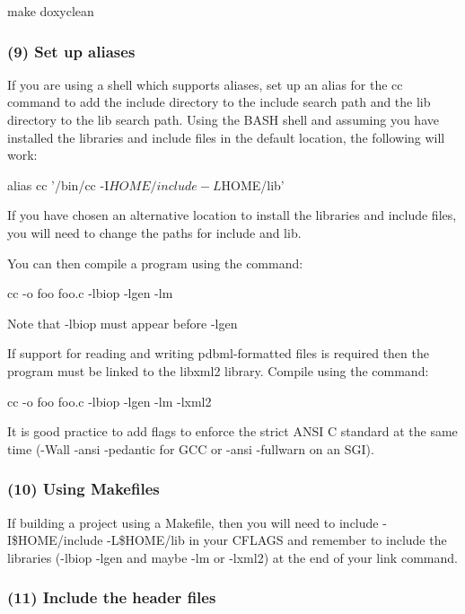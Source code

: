 \begin{DoxyVerb}     make doxyclean
\end{DoxyVerb}


\subsubsection*{(9) Set up aliases}

If you are using a shell which supports aliases, set up an alias for the cc command to add the include directory to the include search path and the lib directory to the lib search path. Using the B\-A\-S\-H shell and assuming you have installed the libraries and include files in the default location, the following will work\-: \begin{DoxyVerb}     alias cc '/bin/cc -I$HOME/include -L$HOME/lib'
\end{DoxyVerb}


If you have chosen an alternative location to install the libraries and include files, you will need to change the paths for include and lib.

You can then compile a program using the command\-: \begin{DoxyVerb}     cc -o foo foo.c -lbiop -lgen -lm
\end{DoxyVerb}


Note that -\/lbiop must appear before -\/lgen

If support for reading and writing pdbml-\/formatted files is required then the program must be linked to the libxml2 library. Compile using the command\-: \begin{DoxyVerb}     cc -o foo foo.c -lbiop -lgen -lm -lxml2
\end{DoxyVerb}


It is good practice to add flags to enforce the strict A\-N\-S\-I C standard at the same time (-\/\-Wall -\/ansi -\/pedantic for G\-C\-C or -\/ansi -\/fullwarn on an S\-G\-I).

\subsubsection*{(10) Using Makefiles}

If building a project using a Makefile, then you will need to include -\/\-I\$\-H\-O\-M\-E/include -\/\-L\$\-H\-O\-M\-E/lib in your C\-F\-L\-A\-G\-S and remember to include the libraries (-\/lbiop -\/lgen and maybe -\/lm or -\/lxml2) at the end of your link command.

\subsubsection*{(11) Include the header files}

